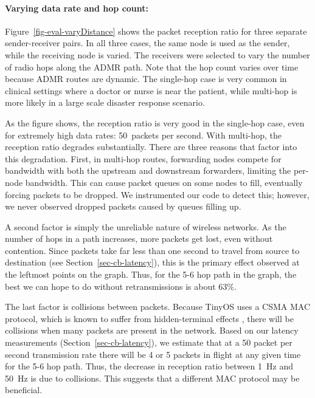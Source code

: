 \paragraph*{Varying data rate and hop count:}
Figure~\ref{fig-eval-varyDistance} shows the packet reception ratio
for three separate sender-receiver pairs. In all three cases, the same
node is used as the sender, while the receiving node is varied. The
receivers were selected to vary the number of radio hops along the
ADMR path. Note that the hop count varies over time because ADMR
routes are dynamic. The single-hop case is very common in clinical
settings where a doctor or nurse is near the patient, while multi-hop
is more likely in a large scale disaster response scenario.

As the figure shows, the reception ratio is very good in the
single-hop case, even for extremely high data rates: 50~packets per
second. With multi-hop, the reception ratio degrades substantially.
There are three reasons that factor into this degradation. First, in
multi-hop routes, forwarding nodes compete for bandwidth with both the
upstream and downstream forwarders, limiting the per-node
bandwidth. This can cause packet queues on some nodes to fill,
eventually forcing packets to be dropped. We instrumented our code to
detect this; however, we never observed dropped packets caused by 
queues filling up.

A second factor is simply the unreliable nature of wireless networks.
As the number of hops in a path increases, more packets get
lost, even without contention. Since packets take
far less than one second to travel from source to destination (see
Section~\ref{sec-cb-latency}), this is the primary effect observed at the
leftmost points on the graph. Thus, for the 5-6 hop path in the
graph, the best we can hope to do without retransmissions is about
63\%.

The last factor is collisions between packets. Because TinyOS uses a
CSMA MAC protocol, which is known to suffer from hidden-terminal
effects \cite{stallings-wireless}, there will be collisions when many
packets are present in the network. Based on our latency measurements
(Section~\ref{sec-cb-latency}), we estimate that at a 50 packet per
second transmission rate there will be 4 or 5 packets in flight at any
given time for the 5-6 hop path. Thus, the decrease in reception
ratio between 1~Hz and 50~Hz is due to collisions. This suggests that
a different MAC protocol may be beneficial.

